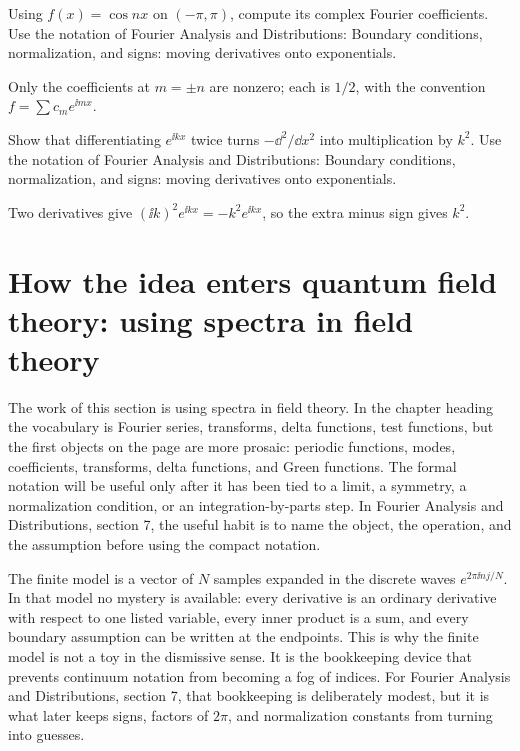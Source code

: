 \begin{exercise}
Using \(f(x)=\cos nx\) on \((-\pi,\pi)\), compute its complex Fourier coefficients.  Use the notation of Fourier Analysis and Distributions: Boundary conditions, normalization, and signs: moving derivatives onto exponentials.
\begin{answer}
Only the coefficients at \(m=\pm n\) are nonzero; each is \(1/2\), with the convention \(f=\sum c_me^{\ii mx}\).
\end{answer}
\end{exercise}

\begin{exercise}
Show that differentiating \(e^{\ii kx}\) twice turns \(-\dd^2/\dd x^2\) into multiplication by \(k^2\).  Use the notation of Fourier Analysis and Distributions: Boundary conditions, normalization, and signs: moving derivatives onto exponentials.
\begin{answer}
Two derivatives give \((\ii k)^2e^{\ii kx}=-k^2e^{\ii kx}\), so the extra minus sign gives \(k^2\).
\end{answer}
\end{exercise}



\section{How the idea enters quantum field theory: using spectra in field theory}

The work of this section is using spectra in field theory.  In the chapter heading the vocabulary is Fourier series, transforms, delta functions, test functions, but the first objects on the page are more prosaic: periodic functions, modes, coefficients, transforms, delta functions, and Green functions.  The formal notation will be useful only after it has been tied to a limit, a symmetry, a normalization condition, or an integration-by-parts step.  In Fourier Analysis and Distributions, section 7, the useful habit is to name the object, the operation, and the assumption before using the compact notation.

The finite model is a vector of \(N\) samples expanded in the discrete waves \(e^{2\pi \ii nj/N}\).  In that model no mystery is available: every derivative is an ordinary derivative with respect to one listed variable, every inner product is a sum, and every boundary assumption can be written at the endpoints.  This is why the finite model is not a toy in the dismissive sense.  It is the bookkeeping device that prevents continuum notation from becoming a fog of indices.  For Fourier Analysis and Distributions, section 7, that bookkeeping is deliberately modest, but it is what later keeps signs, factors of \(2\pi\), and normalization constants from turning into guesses.

